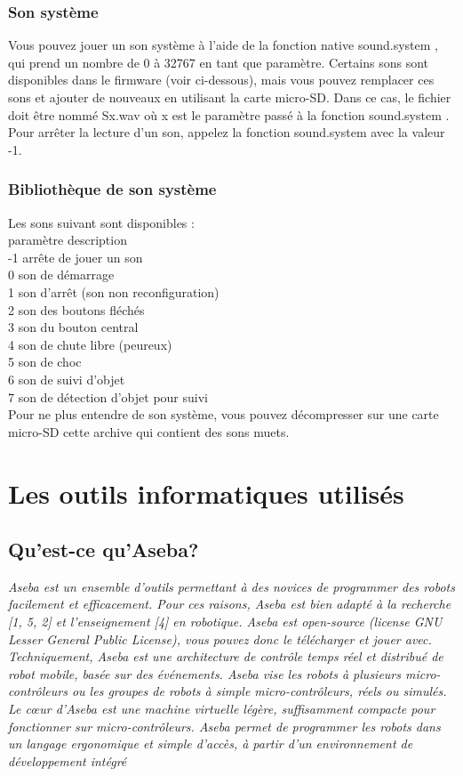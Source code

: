 \documentclass[a4paper, 12pt]{report}
\begin{document}
\subsection{Son système}
Vous pouvez jouer un son système à l'aide de la fonction native sound.system , qui prend un nombre de 0 à 32767 en tant que paramètre. Certains sons sont disponibles dans le firmware (voir ci-dessous), mais vous pouvez remplacer ces sons et ajouter de nouveaux en utilisant la carte micro-SD. Dans ce cas, le fichier doit être nommé Sx.wav où x est le paramètre passé à la fonction sound.system . Pour arrêter la lecture d'un son, appelez la fonction sound.system avec la valeur -1.
\subsection{Bibliothèque de son système}
Les sons suivant sont disponibles :\\
paramètre 	description\\
-1 	arrête de jouer un son\\
0 	son de démarrage\\
1 	son d'arrêt (son non reconfiguration)\\
2 	son des boutons fléchés\\
3 	son du bouton central\\
4 	son de chute libre (peureux)\\
5 	son de choc\\
6 	son de suivi d'objet\\
7 	son de détection d'objet pour suivi\\
Pour ne plus entendre de son système, vous pouvez décompresser sur une carte micro-SD cette archive qui contient des sons muets.

\chapter{Les outils informatiques utilisés}
\section{Qu'est-ce qu'Aseba?\cite{thymio2016}}
\textit{Aseba est un ensemble d'outils permettant à des novices de programmer des robots facilement et efficacement. Pour ces raisons, Aseba est bien adapté à la recherche [1, 5, 2] et l'enseignement [4] en robotique. Aseba est open-source (license GNU Lesser General Public License), vous pouvez donc le télécharger et jouer avec.\\
Techniquement, Aseba est une architecture de contrôle temps réel et distribué de robot mobile, basée sur des événements. Aseba vise les robots à plusieurs micro-contrôleurs ou les groupes de robots à simple micro-contrôleurs, réels ou simulés. Le cœur d'Aseba est une machine virtuelle légère, suffisamment compacte pour fonctionner sur micro-contrôleurs. Aseba permet de programmer les robots dans un langage ergonomique et simple d'accès, à partir d'un environnement de développement intégré}
\end{document}
